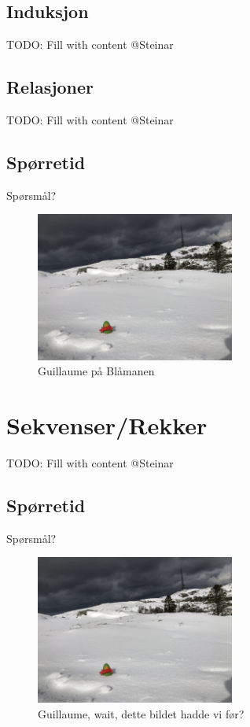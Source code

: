 \subsection{Induksjon}
\begin{frame}
TODO: Fill with content @Steinar 
\end{frame}

\subsection{Relasjoner}
\begin{frame}
TODO: Fill with content @Steinar 
\end{frame}

\subsection*{Spørretid}
\begin{frame}{Spørsmål?}
    \begin{figure}
        \centering
        \includegraphics[height = 4.9cm]{images/guillaume7.jpg}
        \caption{Guillaume på Blåmanen}
        \label{fig:guillaume7a}
    \end{figure}
\end{frame}

\section{Sekvenser/Rekker}
\begin{frame}

TODO: Fill with content @Steinar 
\end{frame}

\subsection*{Spørretid}
\begin{frame}{Spørsmål?}
    \begin{figure}
        \centering
        \includegraphics[height = 4.9cm]{images/guillaume7.jpg}
        \caption{Guillaume, wait, dette bildet hadde vi før?}
        \label{fig:guillaume7b}
    \end{figure}
\end{frame}
